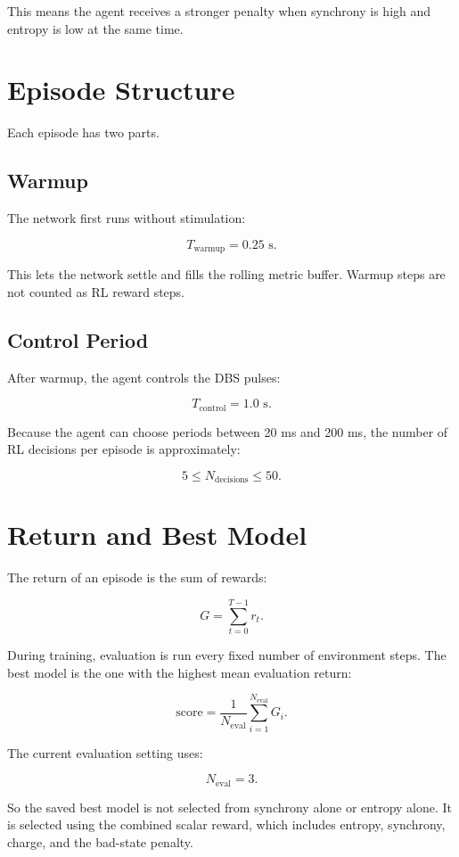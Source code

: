\documentclass[11pt]{article}
\begin{document}
This means the agent receives a stronger penalty when synchrony is high and
entropy is low at the same time.

\section{Episode Structure}

Each episode has two parts.

\subsection{Warmup}

The network first runs without stimulation:

\[
T_{\text{warmup}} = 0.25 \text{ s}.
\]

This lets the network settle and fills the rolling metric buffer. Warmup steps
are not counted as RL reward steps.

\subsection{Control Period}

After warmup, the agent controls the DBS pulses:

\[
T_{\text{control}} = 1.0 \text{ s}.
\]

Because the agent can choose periods between 20 ms and 200 ms, the number of RL
decisions per episode is approximately:

\[
5 \leq N_{\text{decisions}} \leq 50.
\]

\section{Return and Best Model}

The return of an episode is the sum of rewards:

\[
G = \sum_{t=0}^{T-1} r_t.
\]

During training, evaluation is run every fixed number of environment steps. The
best model is the one with the highest mean evaluation return:

\[
\text{score} =
\frac{1}{N_{\text{eval}}}
\sum_{i=1}^{N_{\text{eval}}} G_i.
\]

The current evaluation setting uses:

\[
N_{\text{eval}} = 3.
\]

So the saved best model is not selected from synchrony alone or entropy alone.
It is selected using the combined scalar reward, which includes entropy,
synchrony, charge, and the bad-state penalty.
\end{document}

